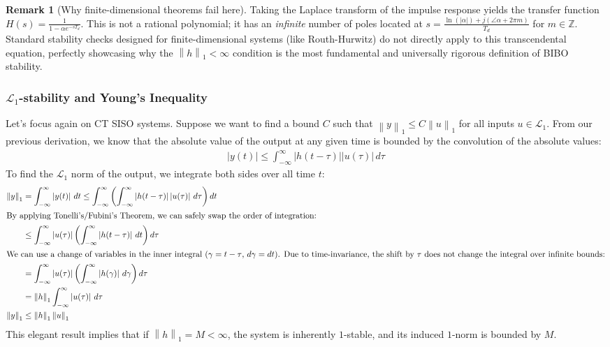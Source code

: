 \documentclass[11pt, a4paper, twoside]{article}
\newcommand{\norm}[1]{\left\lVert#1\right\rVert}
\newcommand{\abs}[1]{\left\lvert#1\right\rvert}
\theoremstyle{plain}
\theoremstyle{definition}
\newtheorem{remark}[theorem]{Remark}
\begin{document}
\begin{remark}[Why finite-dimensional theorems fail here]
Taking the Laplace transform of the impulse response yields the transfer function $H(s) = \frac{1}{1 - \alpha e^{-s T_d}}$. This is not a rational polynomial; it has an \textit{infinite} number of poles located at $s = \frac{\ln(\abs{\alpha}) + j(\angle \alpha + 2\pi m)}{T_d}$ for $m \in \mathbb{Z}$. Standard stability checks designed for finite-dimensional systems (like Routh-Hurwitz) do not directly apply to this transcendental equation, perfectly showcasing why the $\norm{h}_1 < \infty$ condition is the most fundamental and universally rigorous definition of BIBO stability.
\end{remark}


\subsubsection*{$\mathcal{L}_1$-stability and Young's Inequality}

Let's focus again on CT SISO systems. Suppose we want to find a bound $C$ such that $\norm{y}_1 \leq C \norm{u}_1$ for all inputs $u \in \mathcal{L}_{1}$.
% 
From our previous derivation, we know that the absolute value of the output at any given time is bounded by the convolution of the absolute values:
\begin{align*}
\abs{y(t)} \leq \int_{-\infty}^{\infty} \abs{h(t - \tau)} \abs{u(\tau)} \, d\tau
\end{align*}
To find the $\mathcal{L}_1$ norm of the output, we integrate both sides over all time $t$:
\begin{align*}
	\norm{y}_1 &= \int_{-\infty}^{\infty} \abs{y(t)} \, dt \leq \int_{-\infty}^{\infty} \left( \int_{-\infty}^{\infty} \abs{h(t - \tau)} \abs{u(\tau)} \, d\tau \right) dt \\
    \intertext{By applying Tonelli's/Fubini's Theorem, we can safely swap the order of integration:}
	&\leq \int_{-\infty}^{\infty} \abs{u(\tau)} \left( \int_{-\infty}^{\infty} \abs{h(t - \tau)} \, dt \right) d\tau \\
    \intertext{We can use a change of variables in the inner integral ($\gamma = t - \tau$, $d\gamma = dt$). Due to time-invariance, the shift by $\tau$ does not change the integral over infinite bounds:}
	&= \int_{-\infty}^{\infty} \abs{u(\tau)} \left( \int_{-\infty}^{\infty} \abs{h(\gamma)} \, d\gamma \right) d\tau \\
	&= \norm{h}_1 \int_{-\infty}^{\infty} \abs{u(\tau)} \, d\tau \\
	\norm{y}_1 &\leq \norm{h}_1 \norm{u}_1
\end{align*}
%
This elegant result implies that if $\norm{h}_1 = M < \infty$, the system is inherently $1$-stable, and its induced $1$-norm is bounded by $M$. 
\end{document}
